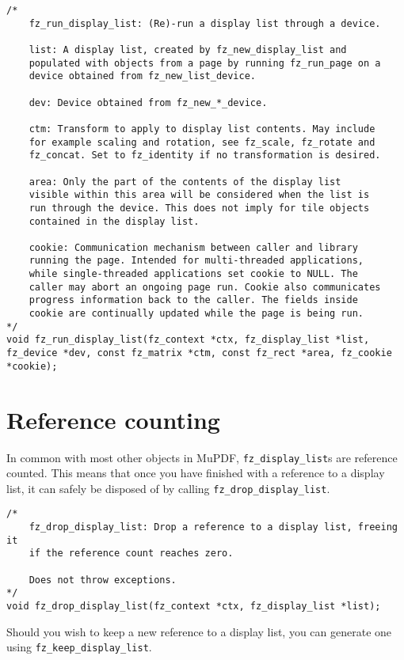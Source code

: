 \documentclass[oneside]{book}
\begin{document}
\begin{lstlisting}
/*
	fz_run_display_list: (Re)-run a display list through a device.

	list: A display list, created by fz_new_display_list and
	populated with objects from a page by running fz_run_page on a
	device obtained from fz_new_list_device.

	dev: Device obtained from fz_new_*_device.

	ctm: Transform to apply to display list contents. May include
	for example scaling and rotation, see fz_scale, fz_rotate and
	fz_concat. Set to fz_identity if no transformation is desired.

	area: Only the part of the contents of the display list
	visible within this area will be considered when the list is
	run through the device. This does not imply for tile objects
	contained in the display list.

	cookie: Communication mechanism between caller and library
	running the page. Intended for multi-threaded applications,
	while single-threaded applications set cookie to NULL. The
	caller may abort an ongoing page run. Cookie also communicates
	progress information back to the caller. The fields inside
	cookie are continually updated while the page is being run.
*/
void fz_run_display_list(fz_context *ctx, fz_display_list *list, fz_device *dev, const fz_matrix *ctm, const fz_rect *area, fz_cookie *cookie);
\end{lstlisting}

\section{Reference counting}

In common with most other objects in MuPDF, \texttt{fz\_display\_list}s are reference counted. This means that once you have finished with a reference to a display list, it can safely be disposed of by calling \texttt{fz\_drop\_display\_list}.

\begin{lstlisting}
/*
	fz_drop_display_list: Drop a reference to a display list, freeing it
	if the reference count reaches zero.

	Does not throw exceptions.
*/
void fz_drop_display_list(fz_context *ctx, fz_display_list *list);
\end{lstlisting}

Should you wish to keep a new reference to a display list, you can generate one using \texttt{fz\_keep\_display\_list}.
\end{document}
